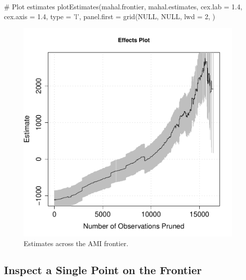 \documentclass[nojss]{jss}
\begin{document}
\begin{minipage}{0.45\textwidth}
\begin{CodeChunk}
\begin{CodeInput}
# Plot estimates
plotEstimates(mahal.frontier, 
              mahal.estimates,
              cex.lab = 1.4,
              cex.axis = 1.4,
              type = 'l',
              panel.first = 
                 grid(NULL,
                      NULL,
                      lwd = 2,
              )
\end{CodeInput}
\end{CodeChunk}
\end{minipage}
\begin{minipage}{0.5\textwidth}
\begin{figure}[H]
\includegraphics{mahal_frontier_est.pdf}
\caption{\label{fig:mahal_frontier_est} Estimates across the AMI frontier.}
\end{figure}
\end{minipage} \hfill
\newline
\newline
\vspace

\subsection{Inspect a Single Point on the Frontier}
\end{document}
